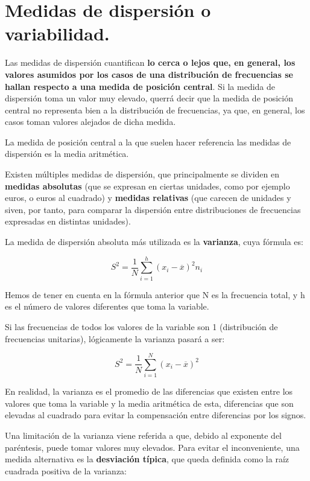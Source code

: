 \documentclass[
]{book}
\begin{document}
\section{Medidas de dispersión o variabilidad.}\label{medidas-de-dispersiuxf3n-o-variabilidad.}

Las medidas de dispersión cuantifican \textbf{lo cerca o lejos que, en general, los valores asumidos por los casos de una distribución de frecuencias se hallan respecto a una medida de posición central}.
Si la medida de dispersión toma un valor muy elevado, querrá decir que la medida de posición central no representa bien a la distribución de frecuencias, ya que, en general, los casos toman valores alejados de dicha medida.

La medida de posición central a la que suelen hacer referencia las medidas de dispersión es la media aritmética.

Existen múltiples medidas de dispersión, que principalmente se dividen en \textbf{medidas absolutas} (que se expresan en ciertas unidades, como por ejemplo euros, o euros al cuadrado) y \textbf{medidas relativas} (que carecen de unidades y siven, por tanto, para comparar la dispersión entre distribuciones de frecuencias expresadas en distintas unidades).

La medida de dispersión absoluta más utilizada es la \textbf{varianza}, cuya fórmula es:

\[
S^2 = \frac{1}{N} \sum_{i=1}^{h} (x_i - \overline{x})^2 n_i
\]

Hemos de tener en cuenta en la fórmula anterior que N es la frecuencia total, y h es el número de valores diferentes que toma la variable.

Si las frecuencias de todos los valores de la variable son 1 (distribución de frecuencias unitarias), lógicamente la varianza pasará a ser:

\[
S^2 = \frac{1}{N} \sum_{i=1}^{N} (x_i - \overline{x})^2
\]

En realidad, la varianza es el promedio de las diferencias que existen entre los valores que toma la variable y la media aritmética de esta, diferencias que son elevadas al cuadrado para evitar la compensación entre diferencias por los signos.

Una limitación de la varianza viene referida a que, debido al exponente del paréntesis, puede tomar valores muy elevados.
Para evitar el inconveniente, una medida alternativa es la \textbf{desviación típica}, que queda definida como la raíz cuadrada positiva de la varianza:
\end{document}
